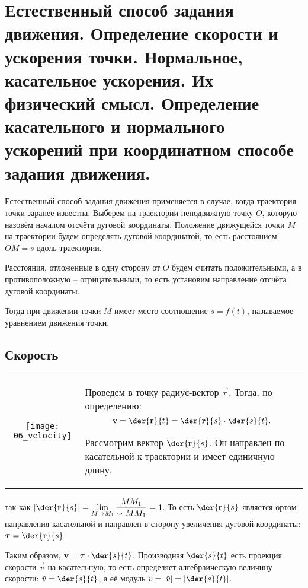 \chapter{Естественный способ задания движения. Определение скорости и ускорения
точки. Нормальное, касательное ускорения. Их физический смысл. Определение
касательного и нормального ускорений при координатном способе задания движения.}

Естественный способ задания движения применяется в случае, когда траектория
точки заранее известна. Выберем на траектории неподвижную точку \( O \), которую
назовём началом отсчёта дуговой координаты. Положение движущейся точки \( M \)
на траектории будем определять дуговой координатой, то есть расстоянием
\( OM = s \) вдоль траектории.

Расстояния, отложенные в одну сторону от \( O \) будем считать положительными, а
в противоположную -- отрицательными, то есть установим направление отсчёта
дуговой координаты.

Тогда при движении точки \( M \) имеет место соотношение \( s = f(t) \),
называемое уравнением движения точки.

\section{Скорость}

\begin{table}[h!]
    \begin{tabular}{C{.37}m{.55\textwidth}}
        \texttt{[image: 06\_velocity]} &
        Проведем в точку радиус-вектор \( \vec{r} \). Тогда, по определению:
        \[
            \vec{v} = \der{\vec{r}}{t} = \der{\vec{r}}{s}\cdot\der{s}{t}.
        \]

        Рассмотрим вектор \( \ds \der{\vec{r}}{s} \). Он направлен по
        касательной к траектории и имеет единичную длину,
    \end{tabular}
\end{table}

так как \( \ds \left|\der{\vec{r}}{s}\right| = \lim_{M\to M_1}\frac{MM_1}
{\smallsmile MM_1} = 1 \). То есть \( \ds\der{\vec{r}}{s} \) является ортом
направления касательной и направлен в сторону увеличения дуговой координаты:
\( \ds \vec{\tau} = \der{\vec{r}}{s} \).

Таким образом, \( \ds \vec{v} = \vec{\tau}\cdot\der{s}{t} \). Производная
\( \ds \der{s}{t} \) есть проекция скорости \( \vec{v} \) на касательную, то
есть определяет алгебраическую величину скорости: \( \ds \tilde{v} =
\der{s}{t} \), а её модуль \( \ds v = |\tilde{v}| = \left|\der{s}{t}\right| \).

